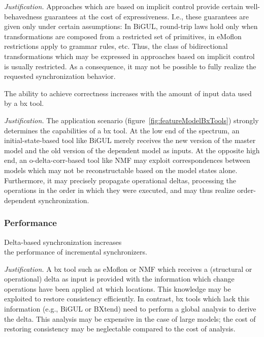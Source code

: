 \emph{Justification.} Approaches which are based on implicit control provide certain well-behavedness guarantees at the cost of expressiveness. I.e., these guarantees are given only under certain assumptions: In BiGUL, round-trip laws hold only when transformations are composed from a restricted set of primitives, in eMoflon restrictions apply to grammar rules, etc. Thus, the class of bidirectional transformations which may be expressed in approaches based on implicit control is usually restricted. As a consequence, it may not be possible to fully realize the requested synchronization behavior.

\begin{hypothesis}
	\label{hyp:corrrectness2}
	The ability to achieve correctness increases with the amount of input data used by a bx tool.
\end{hypothesis}

\emph{Justification.} The application scenario (figure~\ref{fig:featureModelBxTools}) strongly determines the capabilities of a bx tool. At the low end of the spectrum, an initial-state-based tool like BiGUL merely receives the new version of the master model and the old version of the dependent model as inputs. At the opposite high end, an o-delta-corr-based tool like NMF may exploit correspondences between models which may not be reconstructable based on the model states alone. Furthermore, it may precisely propagate operational deltas, processing the operations in the order in which they were executed, and may thus realize order-dependent synchronization. 

\subsubsection{Performance}
\label{sec:HypothesesPerformance}

\begin{hypothesis}
	\label{hyp:performance}
	Delta-based synchronization increases\\the performance of incremental synchronizers.
\end{hypothesis}

\emph{Justification.} A bx tool such as eMoflon or NMF which receives a (structural or operational) delta as input is provided with the information which change operations have been applied at which locations. This knowledge may be exploited to restore consistency efficiently. In contrast, bx tools which lack this information (e.g., BiGUL or BXtend) need to perform a global analysis to derive the delta. This analysis may be expensive in the case of large models; the cost of restoring consistency may be neglectable compared to the cost of analysis.  